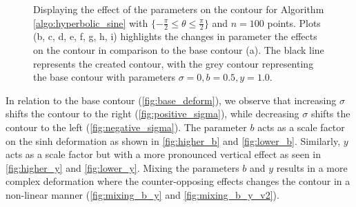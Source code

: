 \documentclass[a4paper]{report}
\begin{document}
\begin{figure}[H]
    \caption{Displaying the effect of the parameters on the contour for Algorithm \ref{algo:hyperbolic_sine} with $\{-\frac{\pi}{2} \leq \theta \leq \frac{\pi}{2} \}$ and $n = 100$ points. Plots (b, c, d, e, f, g, h, i) highlights the changes in parameter the effects on the contour in comparison to the base contour (a). The black line represents the created contour, with the grey contour representing the base contour with parameters $\sigma = 0, b = 0.5, y = 1.0$.}
    \label{fig:deforming_all}
\end{figure}

In relation to the base contour (\autoref{fig:base_deform}), we observe that increasing $\sigma$ shifts the contour to the right (\autoref{fig:positive_sigma}), while decreasing $\sigma$ shifts the contour to the left (\autoref{fig:negative_sigma}). The parameter $b$ acts as a scale factor on the sinh deformation as shown in \autoref{fig:higher_b} and \ref{fig:lower_b}. Similarly, $y$ acts as a scale factor but with a more pronounced vertical effect as seen in \autoref{fig:higher_y} and \ref{fig:lower_y}. Mixing the parameters $b$ and $y$ results in a more complex deformation where the counter-opposing effects changes the contour in a non-linear manner (\autoref{fig:mixing_b_y} and \ref{fig:mixing_b_y_v2}).
\end{document}
